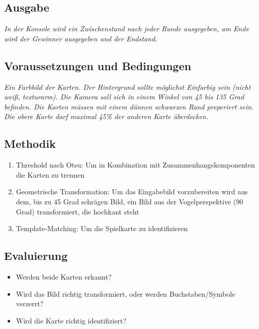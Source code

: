 \documentclass[paper=A4, deutsch]{scrartcl}
\begin{document}
\subsection{Ausgabe}
\textit{In der Konsole wird ein Zwischenstand nach jeder Runde ausgegeben, am Ende wird der Gewinner ausgegeben und der Endstand.}
\subsection{Voraussetzungen und Bedingungen}
\textit{Ein Farbbild der Karten. Der Hintergrund sollte möglichst Einfarbig sein (nicht weiß, texturarm). Die Kamera soll sich in einem Winkel von 45 bis 135 Grad befinden. Die Karten müssen mit einem dünnen schwarzen Rand preperiert sein. Die obere Karte darf maximal 45\% der anderen Karte überdecken.}
\subsection{Methodik}
\begin{enumerate}
	\item Threshold nach Otsu: Um in Kombination mit Zusammenhangskomponenten die Karten zu trennen
	\item Geometrische Transformation: Um das Eingabebild vorzubereiten wird aus dem, bis zu 45 Grad schrägen Bild, ein Bild aus der Vogelperspektive (90 Grad) transformiert, die hochkant steht
	\item Template-Matching: Um die Spielkarte zu identifizieren 
\end{enumerate}
\subsection{Evaluierung}
\begin{itemize}
	\item Werden beide Karten erkannt?
	\item Wird das Bild richtig transformiert, oder werden Buchstaben/Symbole verzerrt?
	\item Wird die Karte richtig identifiziert?
\end{itemize}
\end{document}
